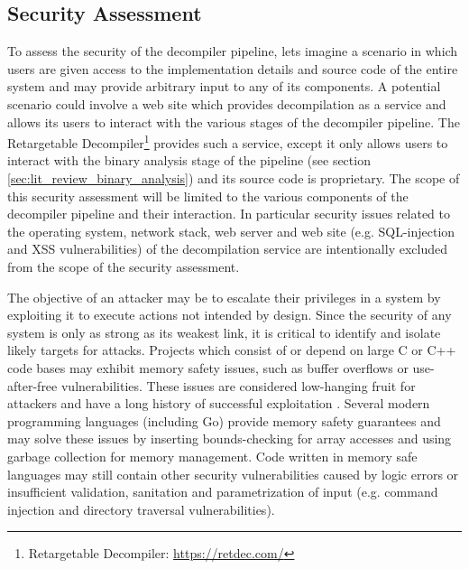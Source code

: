 
\subsection{Security Assessment}
\label{sec:ver_security_assessment}

To assess the security of the decompiler pipeline, lets imagine a scenario in which users are given access to the implementation details and source code of the entire system and may provide arbitrary input to any of its components. A potential scenario could involve a web site which provides decompilation as a service and allows its users to interact with the various stages of the decompiler pipeline. The Retargetable Decompiler\footnote{Retargetable Decompiler: \url{https://retdec.com/}} provides such a service, except it only allows users to interact with the binary analysis stage of the pipeline (see section \ref{sec:lit_review_binary_analysis}) and its source code is proprietary. The scope of this security assessment will be limited to the various components of the decompiler pipeline and their interaction. In particular security issues related to the operating system, network stack, web server and web site (e.g. SQL-injection and XSS vulnerabilities) of the decompilation service are intentionally excluded from the scope of the security assessment.

The objective of an attacker may be to escalate their privileges in a system by exploiting it to execute actions not intended by design. Since the security of any system is only as strong as its weakest link, it is critical to identify and isolate likely targets for attacks. Projects which consist of or depend on large C or C++ code bases may exhibit memory safety issues, such as buffer overflows or use-after-free vulnerabilities. These issues are considered low-hanging fruit for attackers and have a long history of successful exploitation \cite{for_fun_and_profit}. Several modern programming languages (including Go) provide memory safety guarantees and may solve these issues by inserting bounds-checking for array accesses and using garbage collection for memory management. Code written in memory safe languages may still contain other security vulnerabilities caused by logic errors or insufficient validation, sanitation and parametrization of input (e.g. command injection and directory traversal vulnerabilities).

